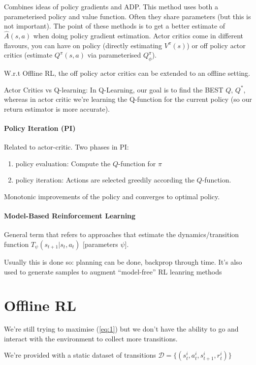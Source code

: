 \documentclass{article}
\begin{document}
Combines ideas of policy gradients and ADP. This method uses both a parameterised policy and value function. Often they share parameters (but this is not important).
The point of these methods is to get a better estimate of \(\hat{A} (s,a)\) when doing policy gradient estimation.
Actor critics come in different flavours, you can have on policy (directly estimating \(V^{\pi}(s)\)) or off policy actor critics (estimate \(Q^{\pi}(s,a)\) via parameterised \(Q^{\pi}_{\phi}\)).


W.r.t Offline RL, the off policy actor critics can be extended to an offline setting.


Actor Critics vs Q-learning: In Q-Learning, our goal is to find the BEST \(Q\), \(Q^{*}\), whereas in actor critic we're learning the Q-function for the current policy (so our return estimator is more accurate).

\paragraph{Policy Iteration (PI)}
Related to actor-critic.
Two phases in PI:
\begin{enumerate}
  \item policy evaluation: Compute the \(Q\)-function for \(\pi\)
  \item policy iteration: Actions are selected greedily according the \(Q\)-function.
\end{enumerate}
Monotonic improvements of the policy and converges to optimal policy.

\paragraph{Model-Based Reinforcement Learning}
General term that refers to approaches that estimate the dynamics/transition function \(T_{\psi}(s_{t+1}|s_{t},a_{t})\) [parameters \(\psi\)].

Usually this is done so: planning can be done, backprop through time. It's also used to generate samples to augment ``model-free'' RL leanring methods

\section{Offline RL}
We're still trying to maximise (\ref{eq:1}) but we don't have the ability to go and interact with the environment to collect more transitions.


We're provided with a static dataset of transitions \(\mathcal{D} = \{ (s_{t}^{i}, a_{t}^{i},s_{t+1}^{i},r_{t}^{i}) \}\)
\end{document}
